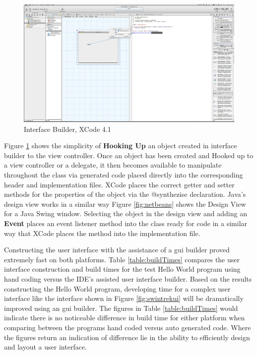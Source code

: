 \documentclass[a4paper,14pt]{article}
\begin{document}
\begin{figure}[H]
\centering
\includegraphics[scale=0.17]{HelloWorldLabelHookUp.eps}
\caption{Interface Builder, XCode 4.1}
\label{fig:interfaceBuilder}
\end{figure}

Figure \ref{fig:interfaceBuilder} shows the simplicity of \textbf{Hooking Up} an object created in interface builder to the view controller. Once an object has been created and Hooked up to a view controller or a delegate, it then becomes available to manipulate throughout the class via generated code placed directly into the corresponding header and implementation files. XCode places the correct getter and setter methods for the properties of the object via the @synthezise declaration. Java's design view works in a similar way Figure \ref{fig:netbeans} shows the Design View for a Java Swing window. Selecting the object in the design view and adding an \textbf{Event} places an event listener method into the class ready for code in a similar way that XCode places the method into the implementation file. 

Constructing the user interface with the assistance of a \gls{gui} builder proved extremely fast on both platforms. Table \ref{table:buildTimes} compares the user interface construction and build times for the test Hello World program using hand coding versus the IDE's assisted user interface builder. Based on the results constructing the Hello World program, developing time for a complex user interface like the interface shown in Figure \ref{fig:swintrekui} will be dramatically improved using an \gls{gui} builder. The figures in Table \ref{table:buildTimes} would indicate there is no noticeable difference in build time for either platform when comparing between the programs hand coded versus auto generated code. Where the figures return an indication of difference lie in the ability to efficiently design and layout a user interface.
\end{document}
